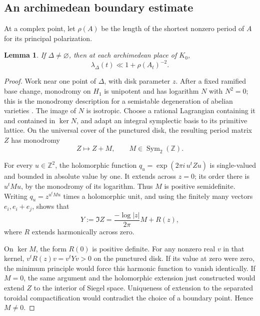 \documentclass[11pt,a4paper]{article}
\numberwithin{equation}{section}
\newtheorem{lemma}[theorem]{Lemma}
\theoremstyle{definition}
\theoremstyle{remark}
\newcommand{\Z}{\mathbb Z}
\begin{document}
\subsection{An archimedean boundary estimate}

At a complex point, let \(\rho(A)\) be the length of the shortest
nonzero period of \(A\) for its principal polarization.

\begin{lemma}\label{lem:arch-boundary}
If \(\Delta\ne\varnothing\), then at each archimedean place of \(K_0\),
\[
 \lambda_\Delta(t)\ll 1+\rho(A_t)^{-2}.
\]
\end{lemma}

\begin{proof}
Work near one point of \(\Delta\), with disk parameter \(z\).
After a fixed ramified base change, monodromy on \(H_1\) is unipotent
and has logarithm \(N\) with \(N^2=0\); this is the monodromy
description for a semistable degeneration of abelian varieties
\cite{SGA7}.
The image of \(N\) is isotropic. Choose a rational Lagrangian
containing it and contained in \(\ker N\), and adapt an integral
symplectic basis to its primitive lattice. On the universal cover
of the punctured disk, the resulting period matrix \(Z\) has monodromy
\[
 Z\longmapsto Z+M,\qquad M\in\operatorname{Sym}_2(\Z).
\]

For every \(u\in\Z^2\), the holomorphic function
\(q_u=\exp(2\pi i\,u^tZu)\) is single-valued and bounded in absolute
value by one. It extends across \(z=0\); its order there is
\(u^tMu\), by the monodromy of its logarithm.
Thus \(M\) is positive semidefinite. Writing
\(q_u=z^{u^tMu}\) times a holomorphic unit, and using the finitely
many vectors \(e_i,e_i+e_j\), shows that
\begin{equation}\label{eq:period-boundary}
 Y:=\Im Z=\frac{-\log|z|}{2\pi}M+R(z),
\end{equation}
where \(R\) extends harmonically across zero.

On \(\ker M\), the form \(R(0)\) is positive definite. For any
nonzero real \(v\) in that kernel, \(v^tR(z)v=v^tYv>0\) on the
punctured disk. If its value at zero were zero, the minimum
principle would force this harmonic function to vanish identically.
If \(M=0\), the same argument and the holomorphic extension just
constructed would extend \(Z\) to the interior of Siegel space.
Uniqueness of extension to the separated toroidal compactification
would contradict the choice of a boundary point. Hence \(M\ne0\).


\end{proof}
\end{document}
